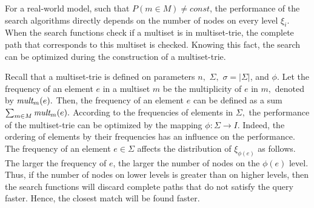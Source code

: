 \documentclass[algorithms,article,accept,pdftex,moreauthors]{Definitions/mdpi}
\begin{document}
For a real-world model, such that $P(m\in M)\neq const$, the performance of the search 
algorithms directly depends on the number of nodes on every level $\xi_i.$ When 
the search functions check if a multiset is in multiset-trie, the complete path that 
corresponds to this multiset is checked. Knowing this fact, the search can be optimized 
during the construction of a multiset-trie. 

Recall that a multiset-trie is defined on parameters $n,$ $\Sigma,$ $\sigma = |\Sigma|$, 
and $\phi.$ Let the frequency of an element $e$ in a multiset $m$ be the multiplicity of 
$e$ in $m,$ denoted by $\emph{mult}_m(e).$ Then, the frequency of an element $e$ 
can be defined as a sum $\sum_{m\in M} \emph{mult}_m(e).$ According to the frequencies 
of elements in $\Sigma,$ the performance of the multiset-trie can be optimized by 
the mapping $\phi : \Sigma \rightarrow I.$ Indeed, the ordering of elements by their 
frequencies has an influence on the performance.
%
The frequency of an element $e\in\Sigma$ affects the distribution of $\xi_{\phi(e)}$ 
as follows. The larger the frequency of $e$, the larger the number of nodes on the
$\phi(e)$ level. 
Thus, if the number of nodes on lower levels is greater than on higher levels, then 
the search functions will discard complete paths that do not satisfy the query 
faster. Hence, the closest match will be found faster.

%
\end{document}

